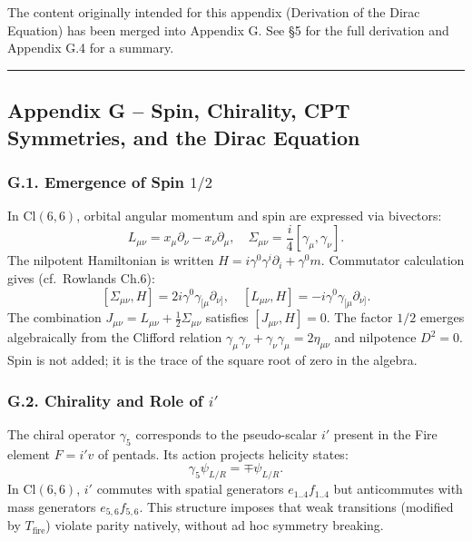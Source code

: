 \documentclass[11pt]{article}
\begin{document}
The content originally intended for this appendix (Derivation of the
Dirac Equation) has been merged into Appendix G. See §5 for the full
derivation and Appendix G.4 for a summary.

\begin{center}\rule{0.5\linewidth}{0.5pt}\end{center}

\hypertarget{appendix-g-spin-chirality-cpt-symmetries-and-the-dirac-equation}{%
\subsection{Appendix G -- Spin, Chirality, CPT Symmetries, and the Dirac
Equation}\label{appendix-g-spin-chirality-cpt-symmetries-and-the-dirac-equation}}

\hypertarget{g.1.-emergence-of-spin-12}{%
\subsubsection{\texorpdfstring{G.1. Emergence of Spin
\(1/2\)}{G.1. Emergence of Spin 1/2}}\label{g.1.-emergence-of-spin-12}}

In \(\text{Cl}(6,6)\), orbital angular momentum and spin are expressed
via bivectors: \[
L_{\mu\nu} = x_\mu \partial_\nu - x_\nu \partial_\mu, \quad \Sigma_{\mu\nu} = \frac{i}{4}[\gamma_\mu,\gamma_\nu].
\] The nilpotent Hamiltonian is written
\(H = i\gamma^0 \gamma^i \partial_i + \gamma^0 m\). Commutator
calculation gives (cf.~Rowlands Ch.6): \[
[\Sigma_{\mu\nu}, H] = 2i\gamma^0 \gamma_{[\mu} \partial_{\nu]}, \quad [L_{\mu\nu}, H] = -i\gamma^0 \gamma_{[\mu} \partial_{\nu]}.
\] The combination
\(J_{\mu\nu} = L_{\mu\nu} + \frac{1}{2}\Sigma_{\mu\nu}\) satisfies
\([J_{\mu\nu}, H]=0\). The factor \(1/2\) emerges algebraically from the
Clifford relation
\(\gamma_\mu\gamma_\nu + \gamma_\nu\gamma_\mu = 2\eta_{\mu\nu}\) and
nilpotence \(D^2=0\). Spin is not added; it is the trace of the square
root of zero in the algebra.

\hypertarget{g.2.-chirality-and-role-of-i}{%
\subsubsection{\texorpdfstring{G.2. Chirality and Role of
\(i'\)}{G.2. Chirality and Role of i'}}\label{g.2.-chirality-and-role-of-i}}

The chiral operator \(\gamma_5\) corresponds to the pseudo-scalar \(i'\)
present in the Fire element \(F=i'v\) of pentads. Its action projects
helicity states: \[
\gamma_5 \psi_{L/R} = \mp \psi_{L/R}.
\] In \(\text{Cl}(6,6)\), \(i'\) commutes with spatial generators
\(e_{1..4}f_{1..4}\) but anticommutes with mass generators
\(e_{5,6}f_{5,6}\). This structure imposes that weak transitions
(modified by \(T_{\text{fire}}\)) violate parity natively, without ad
hoc symmetry breaking.
\end{document}
